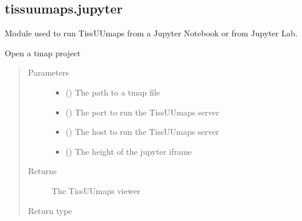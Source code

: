 \documentclass[letterpaper,10pt,english,openany,oneside]{sphinxmanual}
\begin{document}
\subsection{tissuumaps.jupyter}
\label{\detokenize{docs/advanced/jupyter:tissuumaps-jupyter}}
\sphinxAtStartPar
Module used to run TissUUmaps from a Jupyter Notebook or from Jupyter Lab.

\begin{fulllineitems}
\label{\detokenize{docs/advanced/jupyter:tissuumaps.jupyter.opentmap}}
\pysigstartsignatures
{}
\pysigstopsignatures
\sphinxAtStartPar
Open a tmap project
\begin{quote}\begin{description}
\item[{Parameters}] \leavevmode\begin{itemize}
\item {} 
\sphinxAtStartPar
{} () \textendash{} The path to a tmap file

\item {} 
\sphinxAtStartPar
{} () \textendash{} The port to run the TissUUmaps server

\item {} 
\sphinxAtStartPar
{} () \textendash{} The host to run the TissUUmaps server

\item {} 
\sphinxAtStartPar
{} () \textendash{} The height of the jupyter iframe

\end{itemize}

\item[{Returns}] \leavevmode
\sphinxAtStartPar
The TissUUmaps viewer

\item[{Return type}] \leavevmode
\sphinxAtStartPar
{\hyperref[\detokenize{docs/advanced/jupyter:tissuumaps.jupyter.TissUUmapsViewer}]{}}

\end{description}\end{quote}

\end{fulllineitems}
\end{document}
